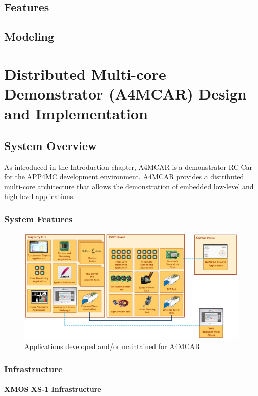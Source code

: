 \section{Features}
\section{Modeling}
\chapter{Distributed Multi-core Demonstrator (A4MCAR) Design and Implementation}
\section{System Overview}
As introduced in the Introduction chapter, A4MCAR is a demonstrator RC-Car for the APP4MC development environment. A4MCAR provides a distributed multi-core architecture that allows the demonstration of embedded low-level and high-level applications. 
\subsection{System Features}
\begin{figure}[htb]
	\includegraphics[scale=0.3]{content/images/tasksoverall.png}
	\caption{Applications developed and/or maintained for A4MCAR}
	\label{fig:tasksoverall}
\end{figure}
\subsection{Infrastructure}
\subsubsection{XMOS XS-1 Infrastructure}
